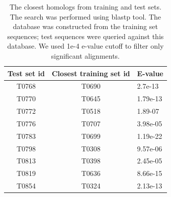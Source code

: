 \begin{table}[H]
\begin{center}
\begin{tabular}{ c | c | l }
    
    Test set id & Closest training set id & E-value \\
    \hline
    T0768 & T0690 & 2.7e-13\\
    T0770 & T0645 & 1.79e-13\\
    T0772 & T0518 & 1.89-07\\
    T0776 & T0707 & 3.98e-05\\
    T0783 & T0699 & 1.19e-22\\
    T0798 & T0308 & 9.57e-06\\
    T0813 & T0398 & 2.45e-05\\
    T0819 & T0636 & 8.66e-15\\
    T0854 & T0324 & 2.13e-13\\
\end{tabular}
    
    \caption {The closest homologs from training and test sets. The search was performed using blastp tool. The database was constructed from 
    the training set sequences; test sequences were queried against this database. We used 1e-4 e-value cutoff to filter only significant 
    alignments.}
    \label{Tbl:datasetsSimilarity}
\end{center}
\end{table}


